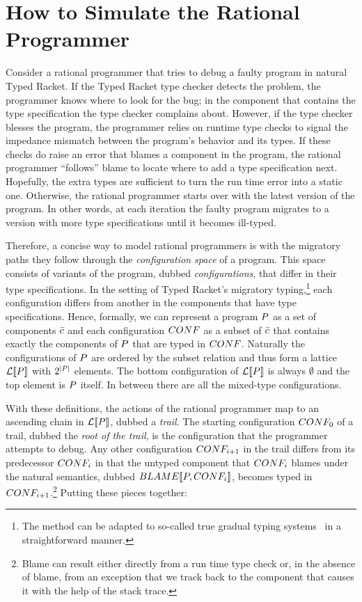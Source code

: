 \section{How to Simulate the Rational Programmer} \label{sec:rational}

Consider a rational programmer  that tries to debug a faulty program in
natural Typed Racket. If the Typed Racket
type checker detects the problem, the programmer knows where
to look for the bug; in the component that contains the type specification
the type checker complains about. However, if
the type checker blesses the program, 
the programmer relies on  runtime type checks  to  signal the impedance mismatch between the
program's behavior and its types. If these checks do raise an error that
blames a component in the program, 
the rational programmer ``follows'' blame to
locate where to add a type specification next.  Hopefully, the extra
types are sufficient to turn the run time error into a static one. Otherwise,
the rational programmer starts over with the latest version of the program. 
In other words, at each iteration the
faulty program migrates to a version with more type specifications until
it becomes ill-typed.

Therefore, a concise way to model rational programmers is with the
migratory paths they follow through the \emph{configuration space} of a
program. This space consists of variants of the program, dubbed
\emph{configurations}, that differ in their type specifications. In the 
setting of Typed Racket's migratory typing,\footnote{The
method can be adapted to so-called true gradual typing
systems~\cite{svcb-snapl-2015} in a straightforward manner.} each
configuration differs from another in the components that have type
specifications. Hence, formally, we can represent a program
$P$ as a set of components $\bar{c}$ and each
configuration $CONF$  as a subset of $\bar{c}$ that contains
exactly the components of  $P$ that are typed in $CONF$. Naturally
the configurations of  $P$ are ordered by the subset relation and
thus form a lattice $\mathcal{L}\llbracket P\rrbracket$ with $2^{\mid P \mid}$ elements.
The bottom configuration of $\mathcal{L}\llbracket P\rrbracket$ is always $\emptyset$ and
the top element is $P$ itself. In between there are all the
mixed-type configurations. 

With these definitions, the actions of the rational programmer map to an ascending chain in
$\mathcal{L}\llbracket P\rrbracket$, dubbed a \emph{trail}. 
The starting configuration $CONF_0$ of a trail,  dubbed the \emph{root of the
trail}, is the configuration that the programmer attempts to debug. Any other
configuration $CONF_{i+1}$ in the trail differs from its predecessor
$CONF_{i}$ in that 
the untyped component  that $CONF_i$ blames under the natural semantics, dubbed $BLAME\llbracket P, CONF_i\rrbracket$,
 becomes typed in $CONF_{i+1}$.\footnote{Blame can result either directly
 from a run time type check or, in the absence of blame, from an
 exception that we track back to the component that causes it with the
 help of the stack trace.} Putting these pieces together:

